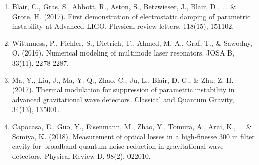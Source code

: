 \begin{enumerate}
\item Blair, C., Gras, S., Abbott, R., Aston, S., Betzwieser, J., Blair, D., ... \& Grote, H. (2017). First demonstration of electrostatic damping of parametric instability at Advanced LIGO. Physical review letters, 118(15), 151102.

\item Wittmuess, P., Piehler, S., Dietrich, T., Ahmed, M. A., Graf, T., \& Sawodny, O. (2016). Numerical modeling of multimode laser resonators. JOSA B, 33(11), 2278-2287.

\item Ma, Y., Liu, J., Ma, Y. Q., Zhao, C., Ju, L., Blair, D. G., \& Zhu, Z. H. (2017). Thermal modulation for suppression of parametric instability in advanced gravitational wave detectors. Classical and Quantum Gravity, 34(13), 135001.

\item Capocasa, E., Guo, Y., Eisenmann, M., Zhao, Y., Tomura, A., Arai, K., ... \& Somiya, K. (2018). Measurement of optical losses in a high-finesse 300 m filter cavity for broadband quantum noise reduction in gravitational-wave detectors. Physical Review D, 98(2), 022010.


\end{enumerate}
